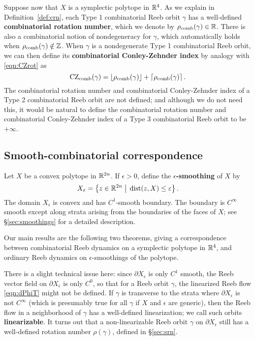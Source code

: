 Suppose now that $X$ is a symplectic polytope in ${\mathbb R}^4$. As we explain in Definition~\ref{def:crn}, each Type 1 combinatorial Reeb orbit $\gamma$ has a well-defined {\bf combinatorial rotation number\/}, which we denote by $\rho_{\operatorname{comb}}(\gamma)\in{\mathbb R}$. There is also a combinatorial notion of nondegeneracy for $\gamma$, which automatically holds when $\rho_{\operatorname{comb}}(\gamma)\notin{\mathbb Z}$. When $\gamma$ is a nondegenerate Type 1 combinatorial Reeb orbit, we can then define its {\bf combinatorial Conley-Zehnder index\/} by analogy with \eqref{eqn:CZrot} as
\begin{equation}
\label{eqn:ccz}
\operatorname{CZ}_{\operatorname{comb}}(\gamma) = \left\lfloor \rho_{\operatorname{comb}}(\gamma) \right\rfloor + \left\lceil \rho_{\operatorname{comb}}(\gamma) \right\rceil.
\end{equation}
The combinatorial rotation number and combinatorial Conley-Zehnder index of a Type 2 combinatorial Reeb orbit are not defined; and although we do not need this, it would be natural to define the combinatorial rotation number and combinatorial Conley-Zehnder index of a Type 3 combinatorial Reeb orbit to be $+\infty$.

\subsection{Smooth-combinatorial correspondence}

Let $X$ be a convex polytope in ${\mathbb R}^{2n}$. If $\epsilon>0$, define the {\bf $\epsilon$-smoothing\/} of $X$ by
\begin{equation}
\label{eqn:deltasmoothing}
X_\varepsilon = \left\{z\in{\mathbb R}^{2n} \;\big|\; \operatorname{dist}(z,X)\le \varepsilon \right\}.
\end{equation}
The domain $X_\epsilon$ is convex and has $C^1$-smooth boundary. The boundary is $C^\infty$ smooth except along strata arising from the boundaries of the faces of $X$; see \S\ref{sec:smoothings} for a detailed description.

Our main results are the following two theorems, giving a correspondence between combinatorial Reeb dynamics on a symplectic polytope in ${\mathbb R}^4$, and ordinary Reeb dynamics on $\epsilon$-smoothings of the polytope.

There is a slight technical issue here: since $\partial X_\epsilon$ is only $C^1$ smooth, the Reeb vector field on $\partial X_\epsilon$ is only $C^0$, so that for a Reeb orbit $\gamma$, the linearized Reeb flow \eqref{eqn:dPhiT} might not be defined. If $\gamma$ is transverse to the strata where $\partial X_\epsilon$ is not $C^\infty$ (which is presumably true for all $\gamma$ if $X$ and $\epsilon$ are generic), then the Reeb flow in a neighborhood of $\gamma$ has a well-defined linearization; we call such orbits {\bf linearizable\/}. It turns out that a non-linearizable Reeb orbit $\gamma$ on $\partial X_\epsilon$ still has a well-defined rotation number $\rho(\gamma)$, defined in \S\ref{sec:srn}.

